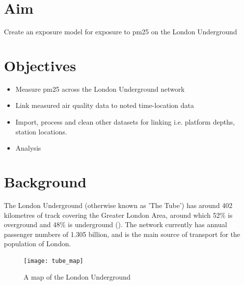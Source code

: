 \section{Aim}
\label{sec:3aim}

Create an exposure model for exposure to \gls{pm25} on the London Underground

\section{Objectives}
\label{sec:3objectives}

\begin{itemize}
\item Measure \gls{pm25} across the London Underground network
\item Link measured air quality data to noted time-location data
\item Import, process and clean other datasets for linking i.e. platform depths, station locations. 
\item Analysis
\end{itemize}

\section{Background}
\label{sec:3background}

The London Underground (otherwise known as 'The Tube') has around 402 kilometres of track covering the Greater London Area, around which 52\% is overground and 48\% is underground (\cite{TransportforLondon2014a}). The network currently has annual passenger numbers of 1.305 billion, and is the main source of transport for the population of London. 

\begin{figure}[H]
\centering
\texttt{[image: tube\_map]}
\caption{A map of the London Underground}
\label{fig:tube_map}
\end{figure}

